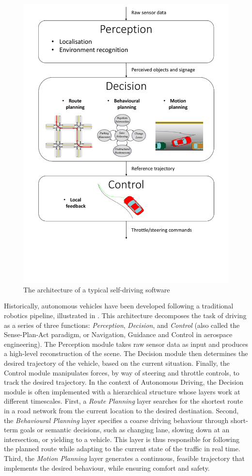 \begin{figure}[th]
	\centering
	\includegraphics[trim={0 5cm 0 0}, clip, width=0.7\linewidth]{img/pipeline}
	\caption{The architecture of a typical self-driving software}
	\label{fig:robotics-pipeline}
\end{figure}

Historically, autonomous vehicles have been developed following a traditional robotics pipeline, illustrated in . This architecture decomposes the task of driving as a series of three functions: \emph{Perception}, \emph{Decision}, and \emph{Control} (also called the Sense-Plan-Act paradigm, or Navigation, Guidance and Control in aerospace engineering). The {Perception} module takes raw sensor data as input and produces a high-level reconstruction of the scene. The {Decision} module then determines the desired trajectory of the vehicle, based on the current situation. Finally, the {Control} module manipulates forces, by way of steering and throttle controls, to track the desired trajectory. In the context of Autonomous Driving, the Decision module is often implemented with a hierarchical structure whose layers work at different timescales. First, a \emph{Route Planning} layer searches for the shortest route in a road network from the current location to the desired destination. Second, the \emph{Behavioural Planning} layer specifies a coarse driving behaviour through short-term goals or semantic decisions, such as changing lane, slowing down at an intersection, or yielding to a vehicle. This layer is thus responsible for following the planned route while adapting to the current state of the traffic in real time. Third, the \emph{Motion Planning} layer generates a continuous, feasible trajectory that implements the desired behaviour, while ensuring comfort and safety.

